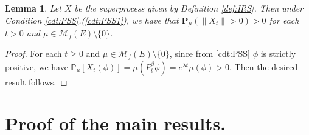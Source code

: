 \documentclass[12pt,a4paper]{amsart}
\numberwithin{equation}{section}
\theoremstyle{plain}
\newtheorem{lem}[thm]{Lemma}
\theoremstyle{definition}
\begin{document}
  \begin{lem}
    \label{lem:PSN}
    Let $X$ be the superprocess given by Definition \ref{def:IRS}. 
    Then under Condition \ref{cdt:PSS}.(\ref{cdt:PSS1}), we have that $\mathbf P_\mu(\|X_t\| > 0) > 0$ for each $t > 0$ and $\mu \in \mathcal M_f(E)\setminus \{0\}$.
  \end{lem}
  
  \begin{proof}
    For each $t\geq 0$ and $\mu \in \mathcal M_f(E)\setminus \{0\}$, since from \ref{cdt:PSS} $\phi$ is strictly positive, we have $\mathbb P_\mu[X_t(\phi)] = \mu(P_t^\beta \phi) = e^{\lambda t} \mu(\phi) > 0$. 
    Then the desired result follows.  
  \end{proof}

\section{Proof of the main results.}
\end{document}
